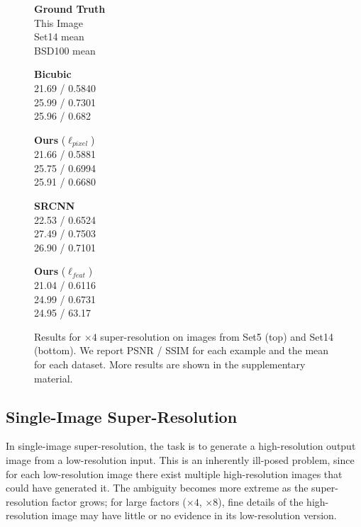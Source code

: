 \documentclass[runningheads]{llncs}
\begin{document}
\begin{figure}[t]
  \vspace{1mm}
  \begin{minipage}{0.20\textwidth}
    \centering \textbf{Ground Truth} \\ This Image \\ Set14 mean \\ BSD100 mean
  \end{minipage}
  \hspace{-0.02\textwidth}
  \begin{minipage}{\mywidth}
    \centering \textbf{Bicubic} \\ 21.69 / 0.5840 \\ 25.99 / 0.7301 \\ 25.96 / 0.682
  \end{minipage}
  \begin{minipage}{\mywidth}
    \centering \textbf{Ours} ($\ell_{pixel}$) \\ 21.66 / 0.5881 \\ 25.75 / 0.6994 \\ 25.91 / 0.6680
  \end{minipage}
  \begin{minipage}{\mywidth}
    \centering \textbf{SRCNN}~\cite{dong2014learning} \\ 22.53 / 0.6524 \\ 27.49 / 0.7503 \\ 
        26.90 / 0.7101
  \end{minipage}
  \begin{minipage}{\mywidth}
    \centering \textbf{Ours} ($\ell_{feat}$) \\  21.04 / 0.6116 \\ 24.99 / 0.6731 \\ 24.95 / 63.17
  \end{minipage}
  \vspace{-3mm}
  \caption{Results for $\times4$ super-resolution on images
    from Set5 (top) and Set14 (bottom). We report PSNR / SSIM for each example
    and the mean for each dataset. More results are shown in the supplementary material.
  }
  \label{fig:SR-4x-results}
  \vspace{-7mm}
\end{figure}

\vspace{-3mm}
\subsection{Single-Image Super-Resolution}
\label{sec:super-res}
In single-image super-resolution, the task is to generate a high-resolution output image from
a low-resolution input. This is an inherently ill-posed problem, since for each low-resolution
image there exist multiple high-resolution images that could have generated it. The ambiguity
becomes more extreme as the super-resolution factor grows; for large factors ($\times4$, $\times8$),
fine details of the high-resolution image may have little or no evidence in its low-resolution version.
\end{document}
